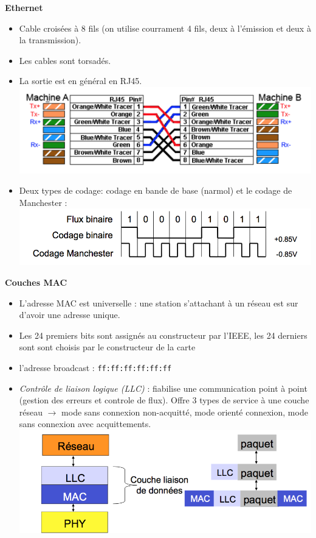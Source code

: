 \documentclass[a4paper,9pt, twocolumn]{article}
\begin{document}
	\textbf{Ethernet}
	\begin{itemize}
		\item Cable croisées à 8 fils (on utilise courrament 4 fils, deux à l'émission et deux à la transmission).
		\item Les cables sont torsadés.
		\item La sortie est en général en RJ45.
			\includegraphics[scale=0.4]{RJ.png}
		\item Deux types de codage: codage en bande de base (narmol) et le codage de Manchester :
			\includegraphics[scale=0.4]{code.png}
	\end{itemize}

	\textbf{Couches MAC}
	\begin{itemize}
		\item L'adresse MAC est universelle : une station s'attachant à un réseau est sur d'avoir une adresse unique. 
		\item Les 24 premiers bits sont assignés au constructeur par l'IEEE, les 24 derniers sont sont choisis par le constructeur de la carte
		\item l'adresse broadcast : \texttt{ff:ff:ff:ff:ff:ff}
		\item \textit{Contrôle de liaison logique (LLC)} : fiabilise une communication point à point (gestion des erreurs et controle de flux).
			Offre 3 types de service à une couche réseau $\longrightarrow$ mode sans connexion non-acquitté, mode orienté connexion, mode sans connexion avec acquittements.		
			\includegraphics[scale=0.4]{LLC.png}
	\end{itemize}
\end{document}
